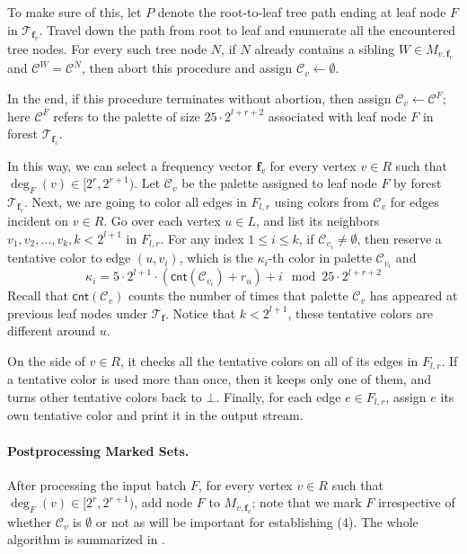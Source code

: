 \documentclass[11pt,a4paper]{article}
\newcommand{\tree}{\mathcal{T}}
\newcommand{\freq}{\mathbf{f}}
\newcommand{\clr}{\mathcal{C}}
\newcommand{\cnt}{\mathsf{cnt}}
\begin{document}
\begin{itemize}
	To make sure of this, let $P$ denote the root-to-leaf tree path ending at leaf node $F$ in $\tree_{\freq_v}$. Travel down the path from root to leaf and enumerate all the encountered tree nodes. For every such tree node $N$, if $N$ already contains a sibling $W\in M_{v, \freq_v}$ and $\clr^W = \clr^N$, then abort this procedure and assign $\clr_v\leftarrow \emptyset$.
	
	In the end, if this procedure terminates without abortion, then assign $\clr_v\leftarrow \clr^F$; here $\clr^F$ refers to the palette of size $25\cdot 2^{l+r+2}$ associated with leaf node $F$ in forest $\tree_{\freq_v}$.
\end{itemize}

In this way, we can select a frequency vector $\freq_v$ for every vertex $v\in R$ such that $\deg_F(v)\in [2^r, 2^{r+1})$. Let $\clr_v$ be the palette assigned to leaf node $F$ by forest $\tree_{\freq_v}$. Next, we are going to color all edges in $F_{l, r}$ using colors from $\clr_v$ for edges incident on $v\in R$. Go over each vertex $u\in L$, and list its neighbors $v_1, v_2, \ldots, v_k, k<2^{l+1}$ in $F_{l, r}$. For any index $1\leq i\leq k$, if $\clr_{v_i}\neq \emptyset$, then reserve a tentative color to edge $(u, v_i)$, which is the $\kappa_i$-th color in palette $\clr_{v_i}$ and $$\kappa_i = 5\cdot 2^{l+1}\cdot\left(\cnt(\clr_{v_i}) + r_u\right) + i \mod 25\cdot 2^{l+r+2}$$
Recall that $\cnt(\clr_{v})$ counts the number of times that palette $\clr_v$ has appeared at previous leaf nodes under $\tree_\freq$. Notice that $k<2^{l+1}$, these tentative colors are different around $u$.

On the side of $v\in R$, it checks all the tentative colors on all of its edges in $F_{l, r}$. If a tentative color is used more than once, then it keeps only one of them, and turns other tentative colors back to $\bot$. Finally, for each edge $e\in F_{l, r}$, assign $e$ its own tentative color and print it in the output stream.

\paragraph*{Postprocessing Marked Sets.} After processing the input batch $F$, for every vertex $v\in R$ such that $\deg_F(v)\in [2^r, 2^{r+1})$, add node $F$ to $M_{v, \freq_v}$; note that we mark $F$ irrespective of whether $\clr_v$ is $\emptyset$ or not as will be important for establishing (4). The whole algorithm is summarized in .
\end{document}
